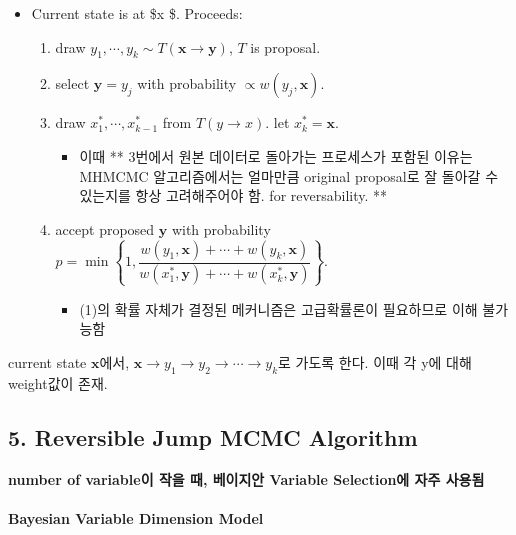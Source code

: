 \documentclass[
]{book}
\providecommand{\tightlist}{%
  \setlength{\itemsep}{0pt}\setlength{\parskip}{0pt}}
\begin{document}
\begin{itemize}
\tightlist
\item
  Current state is at \$\pmb x \$. Proceeds:

  \begin{enumerate}
  \def\labelenumi{\arabic{enumi}.}
  \tightlist
  \item
    draw \(y_1 , \cdots, y_k \sim T(\pmb x \rightarrow \pmb y)\), \(T\) is proposal.
  \item
    select \(\pmb y = y_j\) with probability \(\propto w(y_j , \pmb x)\).
  \item
    draw \(x_1^\ast, \cdots, x_{k-1}^\ast\) from \(T(y \rightarrow x)\). let \(x_k^\ast = \pmb x\).

    \begin{itemize}
    \tightlist
    \item
      이때 ** 3번에서 원본 데이터로 돌아가는 프로세스가 포함된 이유는 MHMCMC 알고리즘에서는 얼마만큼 original proposal로 잘 돌아갈 수 있는지를 항상 고려해주어야 함. for reversability. **
    \end{itemize}
  \item
    accept proposed \(\pmb y\) with probability \(p = \min \left\{ 1, \dfrac{w(y_1, \pmb x) + \cdots + w(y_k, \pmb x)} {w(x_1^\ast, \pmb y) + \cdots + w(x_k^\ast, \pmb y)} \right \} \tag{1}\).

    \begin{itemize}
    \tightlist
    \item
      (1)의 확률 자체가 결정된 메커니즘은 고급확률론이 필요하므로 이해 불가능함
    \end{itemize}
  \end{enumerate}
\end{itemize}

current state \(\pmb x\)에서, \(\pmb x \rightarrow y_1\rightarrow y_2 \rightarrow \cdots \rightarrow y_k\)로 가도록 한다. 이때 각 y에 대해 weight값이 존재.

\hypertarget{reversible-jump-mcmc-algorithm}{%
\subsection{5. Reversible Jump MCMC Algorithm}\label{reversible-jump-mcmc-algorithm}}

\textbf{number of variable이 작을 때, 베이지안 Variable Selection에 자주 사용됨}

\hypertarget{bayesian-variable-dimension-model}{%
\paragraph{Bayesian Variable Dimension Model}\label{bayesian-variable-dimension-model}}
\end{document}
